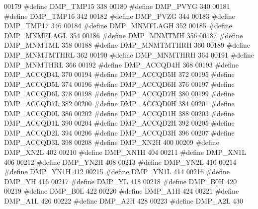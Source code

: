 \begin{DoxyCode}
00179 \textcolor{preprocessor}{#define DMP\_TMP15    338}
00180 \textcolor{preprocessor}{#define DMP\_PVYG    340}
00181 \textcolor{preprocessor}{#define DMP\_TMP16    342}
00182 \textcolor{preprocessor}{#define DMP\_PVZG    344}
00183 \textcolor{preprocessor}{#define DMP\_TMP17    346}
00184 \textcolor{preprocessor}{#define DMP\_MNMFLAGH    352}
00185 \textcolor{preprocessor}{#define DMP\_MNMFLAGL    354}
00186 \textcolor{preprocessor}{#define DMP\_MNMTMH    356}
00187 \textcolor{preprocessor}{#define DMP\_MNMTML    358}
00188 \textcolor{preprocessor}{#define DMP\_MNMTMTHRH    360}
00189 \textcolor{preprocessor}{#define DMP\_MNMTMTHRL    362}
00190 \textcolor{preprocessor}{#define DMP\_MNMTHRH    364}
00191 \textcolor{preprocessor}{#define DMP\_MNMTHRL    366}
00192 \textcolor{preprocessor}{#define DMP\_ACCQD4H    368}
00193 \textcolor{preprocessor}{#define DMP\_ACCQD4L    370}
00194 \textcolor{preprocessor}{#define DMP\_ACCQD5H    372}
00195 \textcolor{preprocessor}{#define DMP\_ACCQD5L    374}
00196 \textcolor{preprocessor}{#define DMP\_ACCQD6H    376}
00197 \textcolor{preprocessor}{#define DMP\_ACCQD6L    378}
00198 \textcolor{preprocessor}{#define DMP\_ACCQD7H    380}
00199 \textcolor{preprocessor}{#define DMP\_ACCQD7L    382}
00200 \textcolor{preprocessor}{#define DMP\_ACCQD0H    384}
00201 \textcolor{preprocessor}{#define DMP\_ACCQD0L    386}
00202 \textcolor{preprocessor}{#define DMP\_ACCQD1H    388}
00203 \textcolor{preprocessor}{#define DMP\_ACCQD1L    390}
00204 \textcolor{preprocessor}{#define DMP\_ACCQD2H    392}
00205 \textcolor{preprocessor}{#define DMP\_ACCQD2L    394}
00206 \textcolor{preprocessor}{#define DMP\_ACCQD3H    396}
00207 \textcolor{preprocessor}{#define DMP\_ACCQD3L    398}
00208 \textcolor{preprocessor}{#define DMP\_XN2H    400}
00209 \textcolor{preprocessor}{#define DMP\_XN2L    402}
00210 \textcolor{preprocessor}{#define DMP\_XN1H    404}
00211 \textcolor{preprocessor}{#define DMP\_XN1L    406}
00212 \textcolor{preprocessor}{#define DMP\_YN2H    408}
00213 \textcolor{preprocessor}{#define DMP\_YN2L    410}
00214 \textcolor{preprocessor}{#define DMP\_YN1H    412}
00215 \textcolor{preprocessor}{#define DMP\_YN1L    414}
00216 \textcolor{preprocessor}{#define DMP\_YH    416}
00217 \textcolor{preprocessor}{#define DMP\_YL    418}
00218 \textcolor{preprocessor}{#define DMP\_B0H    420}
00219 \textcolor{preprocessor}{#define DMP\_B0L    422}
00220 \textcolor{preprocessor}{#define DMP\_A1H    424}
00221 \textcolor{preprocessor}{#define DMP\_A1L    426}
00222 \textcolor{preprocessor}{#define DMP\_A2H    428}
00223 \textcolor{preprocessor}{#define DMP\_A2L    430}

\end{DoxyCode}
